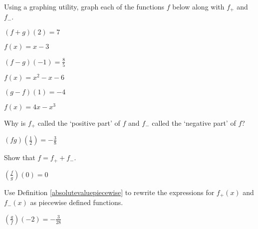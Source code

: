 \documentclass{ximera}
\begin{document}
\begin{question}
Using a graphing utility, graph each of the functions $f$ below along with $f_{+}$ and $f_{-}$.



\begin{solution}
$(f+g)(2) = 7$
\end{solution}

\end{question}

\begin{question}
$f(x) = x-3$
\begin{solution}
$(f-g)(-1) = \frac{8}{5}$
\end{solution}

\end{question}

\begin{question}
$f(x) = x^2-x-6$
\begin{solution}
$(g-f)(1) = -4$

\end{solution}

\end{question}

\begin{question}
$f(x) = 4x-x^3$

Why is $f_{+}$ called the `positive part' of $f$ and $f_{-}$ called the `negative part' of $f$?
\begin{solution}
$(fg)\left(\frac{1}{2}\right) = -\frac{3}{8}$
\end{solution}

\end{question}

\begin{question}
Show that $f = f_{+} + f_{-}$.
\begin{solution}
$\left(\frac{f}{g}\right)(0) = 0$
\end{solution}

\end{question}

\begin{question}
Use Definition \ref{absolutevaluepiecewise} to rewrite the expressions for $f_{+}(x)$ and $f_{-}(x)$ as piecewise defined functions.
\begin{solution}
$\left(\frac{g}{f}\right)\left(-2\right) = -\frac{3}{28}$

\end{solution}

\end{question}
\end{document}

